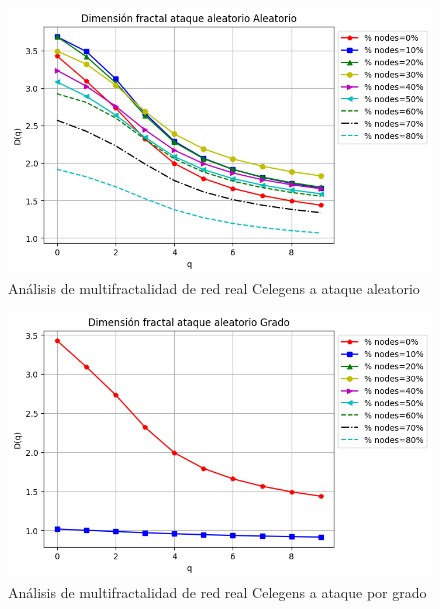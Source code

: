 \begin{figure}[H]
    \centering
    \includegraphics[scale=0.7]{Capitulo6MultifractalidadYRobustez/imagenes/grafica_DqRandom20180508_020345Celengs.png}
    \caption{Análisis de multifractalidad de red real Celegens a ataque aleatorio}
\end{figure}

\begin{figure}[H]
    \centering
    \includegraphics[scale=0.7]{Capitulo6MultifractalidadYRobustez/imagenes/grafica_DqDegree20180508_020345Celengs.png}
    \caption{Análisis de multifractalidad de red real Celegens a ataque por grado}
\end{figure}

